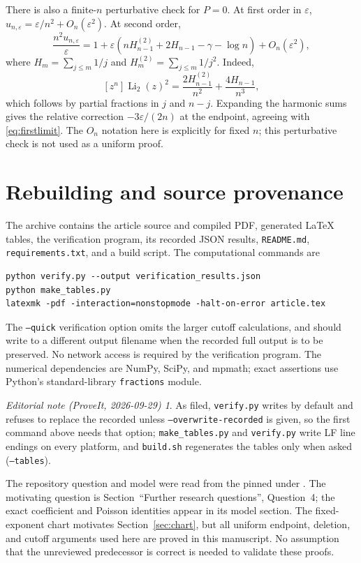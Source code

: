 \documentclass[11pt,a4paper]{article}
\theoremstyle{definition}\newtheorem{definition}[theorem]{Definition}
\theoremstyle{remark}\newtheorem{remark}[theorem]{Remark}
\newtheorem*{ednote}{Editorial note (ProveIt, 2026-09-29)}
\newcommand{\eps}{\varepsilon}
\newcommand{\Li}{\operatorname{Li}}
\newcommand{\1}{\mathbf 1}
\begin{document}
There is also a finite-$n$ perturbative check for $P=0$. At first order
in $\eps$, $u_{n,\eps}=\eps/n^2+O_n(\eps^2)$. At second order,
\begin{equation}\label{eq:perturbcheck}
 \frac{n^2u_{n,\eps}}{\eps}
 =1+\eps\left(nH_{n-1}^{(2)}+2H_{n-1}-\gamma-\log n\right)
 +O_n(\eps^2),
\end{equation}
where $H_m=\sum_{j\le m}1/j$ and
$H_m^{(2)}=\sum_{j\le m}1/j^2$. Indeed,
\[
 [z^n]\Li_2(z)^2
 =\frac{2H_{n-1}^{(2)}}{n^2}+\frac{4H_{n-1}}{n^3},
\]
which follows by partial fractions in $j$ and $n-j$.
Expanding the harmonic sums gives the relative correction
$-3\eps/(2n)$ at the endpoint, agreeing with
\eqref{eq:firstlimit}. The $O_n$ notation here is explicitly for fixed
$n$; this perturbative check is not used as a uniform proof.

\section{Rebuilding and source provenance}
\label{app:reproduce}

The archive contains the article source and compiled PDF, generated
LaTeX tables, the verification program, its recorded JSON results,
\texttt{README.md}, \texttt{requirements.txt}, and a build script.
The computational commands are
\begin{lstlisting}
python verify.py --output verification_results.json
python make_tables.py
latexmk -pdf -interaction=nonstopmode -halt-on-error article.tex
\end{lstlisting}
The \texttt{--quick} verification option omits the larger cutoff
calculations, and should write to a different output filename when the
recorded full output is to be preserved. No network access is required
by the verification program. The numerical dependencies are NumPy,
SciPy, and mpmath; exact assertions use Python's standard-library
\texttt{fractions} module.
\begin{ednote}
As filed, \texttt{verify.py} writes  by
default and refuses to replace the recorded
 unless \texttt{--overwrite-recorded} is
given, so the first command above needs that option;
\texttt{make\_tables.py} and \texttt{verify.py} write LF line endings on
every platform, and \texttt{build.sh} regenerates the tables only when asked
(\texttt{--tables}).
\end{ednote}

The repository question and model were read from the pinned
under .
The motivating question is Section~``Further research questions'',
Question~4; the exact coefficient and Poisson identities appear in its
model section. The fixed-exponent chart motivates
Section~\ref{sec:chart}, but all uniform endpoint, deletion, and cutoff
arguments used here are proved in this manuscript. No assumption that
the unreviewed predecessor is correct is needed to validate these proofs.
\end{document}

